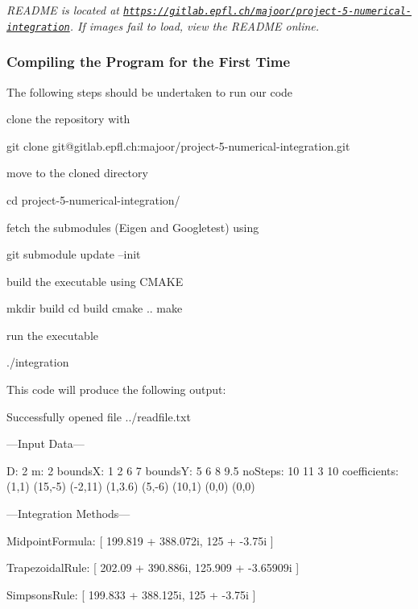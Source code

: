 {\itshape R\+E\+A\+D\+ME is located at \href{https://gitlab.epfl.ch/majoor/project-5-numerical-integration}{\tt https\+://gitlab.\+epfl.\+ch/majoor/project-\/5-\/numerical-\/integration}. If images fail to load, view the R\+E\+A\+D\+ME online.}

\subsubsection*{Compiling the Program for the First Time}

The following steps should be undertaken to run our code
\begin{DoxyItemize}
\item clone the repository with 
\begin{DoxyCode}
git clone git@gitlab.epfl.ch:majoor/project-5-numerical-integration.git
\end{DoxyCode}

\item move to the cloned directory 
\begin{DoxyCode}
cd project-5-numerical-integration/
\end{DoxyCode}

\item fetch the submodules (Eigen and Googletest) using 
\begin{DoxyCode}
git submodule update --init
\end{DoxyCode}

\item build the executable using C\+M\+A\+KE 
\begin{DoxyCode}
mkdir build
cd build
cmake ..
make
\end{DoxyCode}

\item run the executable 
\begin{DoxyCode}
./integration
\end{DoxyCode}

\end{DoxyItemize}

This code will produce the following output\+: 
\begin{DoxyCode}
Successfully opened file ../readfile.txt

---Input Data---

D: 2
m: 2
boundsX: 
1 2
6 7
boundsY: 
  5   6
  8 9.5
noSteps: 
10 11
 3 10
coefficients: 
  (1,1) (15,-5) (-2,11) (1,3.6)
 (5,-6)  (10,1)   (0,0)   (0,0)

---Integration Methods---

MidpointFormula:
[ 199.819 + 388.072i,
125 + -3.75i ]

TrapezoidalRule:
[ 202.09 + 390.886i,
125.909 + -3.65909i ]

SimpsonsRule:
[ 199.833 + 388.125i,
125 + -3.75i ]
\end{DoxyCode}


